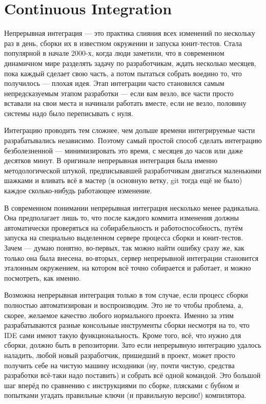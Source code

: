 \documentclass{../../text-style}
\begin{document}
\section{Continuous Integration}

Непрерывная интеграция --- это практика слияния всех изменений по нескольку раз в день, сборки их в известном окружении и запуска юнит-тестов. Стала популярной в начале 2000-х, когда люди заметили, что в современном динамичном мире разделять задачу по разработчикам, ждать несколько месяцев, пока каждый сделает свою часть, а потом пытаться собрать воедино то, что получилось --- плохая идея. Этап интеграции часто становился самым непредсказуемым этапом разработки --- если вам везло, все части просто вставали на свои места и начинали работать вместе, если не везло, половину системы надо было переписывать с нуля. 

Интеграцию проводить тем сложнее, чем дольше времени интегрируемые части разрабатывались независимо. Поэтому самый простой способ сделать интеграцию безболезненной --- минимизировать это время, с месяцев до часов или даже десятков минут. В оригинале непрерывная интеграция была именно методологической штукой, предписывавшей разработчикам двигаться маленькими шажками и вливать всё в мастер (в основную ветку, git тогда ещё не было) каждое сколько-нибудь работающее изменение.

В современном понимании непрерывная интеграция несколько менее радикальна. Она предполагает лишь то, что после каждого коммита изменения должны автоматически проверяться на собирабельность и работоспособность, путём запуска на специально выделенном сервере процесса сборки и юнит-тестов. Зачем --- думаю понятно, во-первых, так можно найти ошибку сразу же, как только она была внесена, во-вторых, сервер непрерывной интеграции становится эталонным окружением, на котором всё точно собирается и работает, и можно посмотреть, как именно. 

Возможна непрерывная интеграция только в том случае, если процесс сборки полностью автоматизирован и воспроизводим. Это не то чтобы проблема, а, скорее, желаемое качество любого нормального проекта. Именно за этим разрабатываются разные консольные инструменты сборки несмотря на то, что IDE сами имеют такую функциональность. Кроме того, всё, что нужно для сборки, должно быть в репозитории. Зато если непрерывную интеграцию удалось наладить, любой новый разработчик, пришедший в проект, может просто получить себе на чистую машину исходники (ну, почти чистую, средства разработки всё-таки надо поставить) и собрать всё одной командой. Это большой шаг вперёд по сравнению с инструкциями по сборке, плясками с бубном и попытками угадать правильные ключи (и правильную версию!) компилятора.
\end{document}
